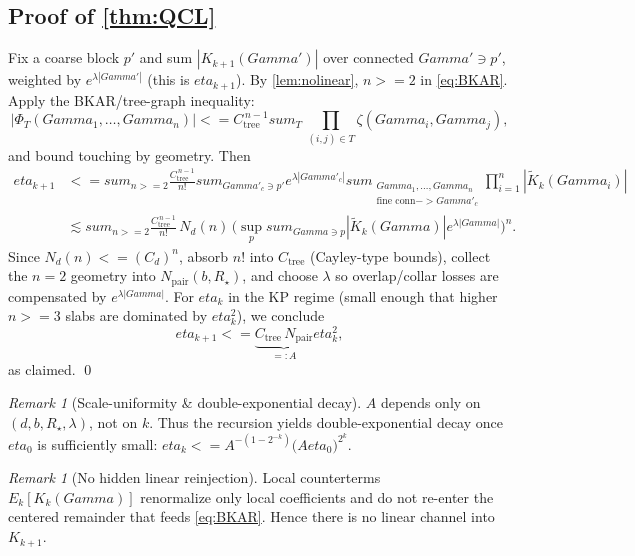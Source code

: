 \documentclass[11pt]{article}
\def\;{ }%
\def\eta{eta}%
\def\Gamma{Gamma}%
\def\E{E}%
\def\sum{sum}%
\def\le{<=}%
\def\ge{>=}%
\def\to{->}%
\theoremstyle{definition}
\theoremstyle{remark}
\newtheorem{remark}[theorem]{Remark}
\newcommand{\E}{\mathbb{E}}
\newcommand{\1}{\mathbbm{1}}
\newcommand{\abs}[1]{\left\lvert #1 \right\rvert}
\begin{document}
\subsection*{Proof of \cref{thm:QCL}}
Fix a coarse block $p'$ and sum $\abs{K_{k+1}(\Gamma')}$ over connected $\Gamma'\ni p'$, weighted by $e^{\lambda\abs{\Gamma'}}$ (this is $\eta_{k+1}$). By \cref{lem:nolinear}, $n\ge 2$ in \eqref{eq:BKAR}.
Apply the BKAR/tree-graph inequality:
\begin{equation}\label{eq:BKARbound}
\abs{\Phi_T(\Gamma_1,\dots,\Gamma_n)}\;\le\;C_{\mathrm{tree}}^{\,n-1}
\sum_{T}\ \prod_{(i,j)\in T}\zeta(\Gamma_i,\Gamma_j),
\end{equation}
and bound touching by geometry. Then
\begin{align*}
\eta_{k+1}
&\le \sum_{n\ge 2}\frac{C_{\mathrm{tree}}^{\,n-1}}{n!}
\sum_{\Gamma'_c\ni p'}e^{\lambda\abs{\Gamma'_c}}
\sum_{\substack{\Gamma_1,\dots,\Gamma_n\\ \text{fine conn}\to \Gamma'_c}}
\prod_{i=1}^n \abs{\widetilde K_k(\Gamma_i)}\\
&\lesssim \sum_{n\ge 2}\frac{C_{\mathrm{tree}}^{\,n-1}}{n!}
\,N_d(n)\,\Big(\sup_{p}\sum_{\Gamma\ni p}\abs{\widetilde K_k(\Gamma)}e^{\lambda\abs{\Gamma}}\Big)^{\!n}.
\end{align*}
Since $N_d(n)\le (C_d)^n$, absorb $n!$ into $C_{\mathrm{tree}}$ (Cayley-type bounds), collect the $n=2$ geometry into $N_{\mathrm{pair}}(b,R_\star)$, and choose $\lambda$ so overlap/collar losses are compensated by $e^{\lambda\abs{\Gamma}}$. For $\eta_k$ in the KP regime (small enough that higher $n\ge 3$ slabs are dominated by $\eta_k^2$), we conclude
\[
\eta_{k+1}\;\le\; \underbrace{C_{\mathrm{tree}}\, N_{\mathrm{pair}}}_{=:A}\;\eta_k^2,
\]
as claimed. \qed

\begin{remark}[Scale-uniformity \& double-exponential decay]
$A$ depends only on $(d,b,R_\star,\lambda)$, not on $k$. Thus the recursion yields double-exponential decay once $\eta_0$ is sufficiently small: $\eta_k \le A^{-(1-2^{-k})}\big(A\eta_0\big)^{2^k}$.
\end{remark}

\begin{remark}[No hidden linear reinjection]
Local counterterms $\E_k[K_k(\Gamma)]$ renormalize only local coefficients and do not re-enter the centered remainder that feeds \eqref{eq:BKAR}. Hence there is no linear channel into $K_{k+1}$.
\end{remark}

\end{document}

